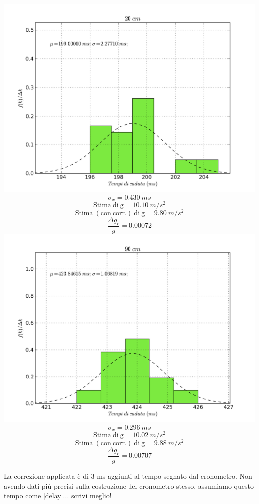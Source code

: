 \begin{center}
\includegraphics[scale=0.75]{../grafici/20cm.png}
$$\sigma_{\bar{x}} = 0.430\ ms$$
$$\mathrm{Stima\ di\ g} = 10.10\ m/s^2$$
$$\mathrm{Stima\ (con\ corr.)\ di\ g} = 9.80\ m/s^2 $$
$$\frac{\Delta g_c}{g} = 0.00072$$
\includegraphics[scale=0.75]{../grafici/90cm.png}
$$\sigma_{\bar{x}} = 0.296\ ms $$
$$\mathrm{Stima\ di\ g} = 10.02\ m/s^2$$
$$\mathrm{Stima\ (con\ corr.)\ di\ g} = 9.88\ m/s^2 $$
$$\frac{\Delta g_c}{g} = 0.00707$$
\end{center}

La correzione applicata è di 3 ms aggiunti al tempo segnato dal cronometro. Non avendo dati più precisi sulla costruzione del cronometro stesso, assumiamo questo tempo come [delay]... scrivi meglio!

